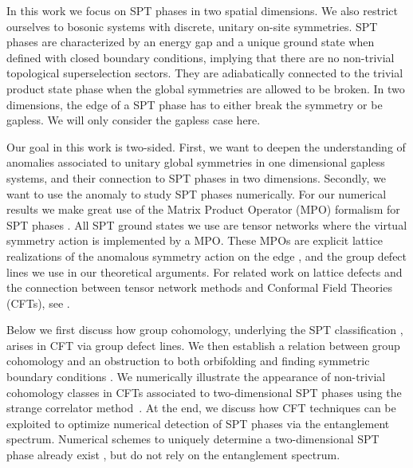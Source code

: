 \documentclass[aps,pra,twocolumn,superscriptaddress,10pt,article,nofootinbib,showpacs]{revtex4-1}
\begin{document}
In this work we focus on SPT phases in two spatial dimensions. We also restrict ourselves to bosonic systems with discrete, unitary on-site symmetries. SPT phases are characterized by an energy gap and a unique ground state when defined with closed boundary conditions, implying that there are no non-trivial topological superselection sectors. They are adiabatically connected to the trivial product state phase when the global symmetries are allowed to be broken. In two dimensions, the edge of a SPT phase has to either break the symmetry or be gapless. We will only consider the gapless case here.

Our goal in this work is two-sided. First, we want to deepen the understanding of anomalies associated to unitary global symmetries in one dimensional gapless systems, and their connection to SPT phases in two dimensions. Secondly, we want to use the anomaly to study SPT phases numerically. For our numerical results we make great use of the Matrix Product Operator (MPO) formalism for SPT phases \cite{ChenLiu,SPTpaper}. All SPT ground states we use are tensor networks where the virtual symmetry action is implemented by a MPO. These MPOs are explicit lattice realizations of the anomalous symmetry action on the edge \cite{ChenLiu}, and the group defect lines we use in our theoretical arguments. For related work on lattice defects and the connection between tensor network methods and Conformal Field Theories (CFTs), see \cite{ChuiMercat,Aasen,Bridgeman1,BridgemanOBrien,HauruEvenbly,Bal}.

Below we first discuss how group cohomology, underlying the SPT classification \cite{ChenGu}, arises in CFT via group defect lines. We then establish a relation between group cohomology and an obstruction to both orbifolding \cite{RyuZhang,SuleChen,HsiehSule} and finding symmetric boundary conditions \cite{HanTiwari}. We numerically illustrate the appearance of non-trivial cohomology classes in CFTs associated to two-dimensional SPT phases using the strange correlator method~\cite{YouBi}. At the end, we discuss how CFT techniques can be exploited to optimize numerical detection of SPT phases via the entanglement spectrum. Numerical schemes to uniquely determine a two-dimensional SPT phase already exist \cite{Zaletel}, but do not rely on the entanglement spectrum.
\end{document}
